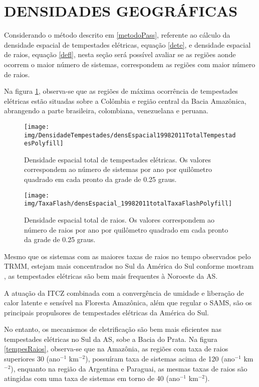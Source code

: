 \section{DENSIDADES GEOGRÁFICAS}
\label{secaoDensidades}

Considerando o método descrito em \ref{metodoPass}, referente ao cálculo da densidade espacial de tempestades elétricas, equação \ref{dete}, e densidade espacial de raios, equação \ref{defl}, nesta seção será possível avaliar se as regiões aonde ocorrem o maior número de sistemas, correspondem as regiões com maior número de raios.

Na figura \ref{tempestadestotal}, observa-se que as regiões de máxima ocorrência de tempestades elétricas estão situadas sobre a Colômbia e região central da Bacia Amazônica, abrangendo a parte brasileira, colombiana, venezuelana e peruana.

\begin{figure}[!ht]
 \centering
 {\texttt{[image: img/DensidadeTempestades/densEspacial19982011TotalTempestadesPolyfill]}}
\caption{Densidade espacial total de tempestades elétricas. Os valores correspondem ao número de sistemas por ano por quilômetro quadrado em cada pronto da grade de 0.25 graus.}
 \label{tempestadestotal}
\end{figure}
  
\begin{figure}[!ht]
 \centering
  {\texttt{[image: img/TaxaFlash/densEspacial\_19982011totalTaxaFlashPolyfill]}}
  \caption{Densidade espacial total de raios. Os valores correspondem ao número de raios por ano por quilômetro quadrado em cada pronto da grade de 0.25 graus.}
  \label{raiosTotal}
\end{figure}

Mesmo que os sistemas com as maiores taxas de raios no tempo observados pelo TRMM, estejam mais concentrados no Sul da América do Sul conforme mostram , as tempestades elétricas são bem mais frequentes à Noroeste da AS.

A atuação da ITCZ combinada com a convergência de umidade e liberação de calor latente e sensível na Floresta Amazônica, além que regular o SAMS, são os principais propulsores de tempestades elétricas da América do Sul. %

No entanto, os mecanismos de eletrificação são bem mais eficientes nas tempestades elétricas no Sul da AS, sobe a Bacia do Prata. Na figura \ref{tempesRaios}, observa-se que na Amazônia, as regiões com taxa de raios superiores 30 (ano$^{-1}$ km$^{-2}$), possuíram taxa de sistemas acima de 120 (ano$^{-1}$ km$^{-2}$), enquanto na região da Argentina e Paraguai, as mesmas taxas de raios são atingidas com uma taxa de sistemas em torno de 40 (ano$^{-1}$ km$^{-2}$).

